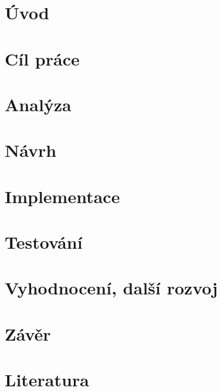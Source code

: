 \chapter*{Úvod}

\chapter{Cíl práce}

\setcounter{page}{1}


\chapter{Analýza}



\chapter{Návrh}
%

\chapter{Implementace}
%

\chapter{Testování}
%

\chapter{Vyhodnocení, další rozvoj}
%

\chapter*{Závěr}
\chapter*{Literatura}
